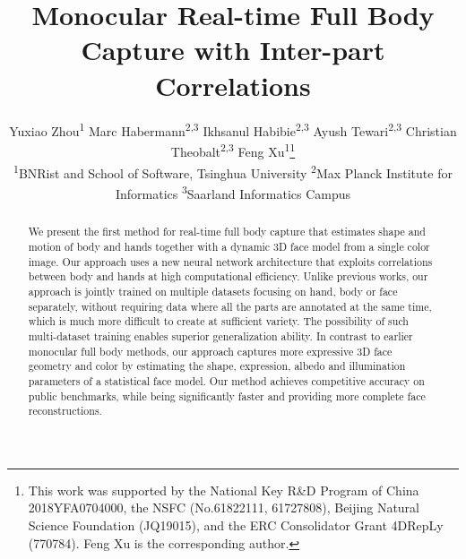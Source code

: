 \documentclass[final]{cvpr}
\begin{document}
\setlength{\abovecaptionskip}{1pt}

\setlength{\belowcaptionskip}{-10pt}

\title{Monocular Real-time Full Body Capture with Inter-part Correlations}

\author{
  \normalsize{Yuxiao Zhou\textsuperscript{1}}
  \quad
  \normalsize{Marc Habermann\textsuperscript{2,3}}
  \quad
  \normalsize{Ikhsanul Habibie\textsuperscript{2,3}}
  \quad
  \normalsize{Ayush Tewari\textsuperscript{2,3}}
  \quad
  \normalsize{Christian Theobalt\textsuperscript{2,3}}
  \quad
  \normalsize{Feng Xu\textsuperscript{1}\thanks{This work was supported by the National Key R\&D Program of China 2018YFA0704000, the NSFC (No.61822111, 61727808), Beijing Natural Science Foundation (JQ19015), and the ERC Consolidator Grant 4DRepLy (770784). Feng Xu is the corresponding author.}}\\
  \small{\textsuperscript{1}BNRist and School of Software, Tsinghua University}
  \quad
  \small{\textsuperscript{2}Max Planck Institute for Informatics}
  \quad
  \small{\textsuperscript{3}Saarland Informatics Campus}
}

\maketitle

\begin{abstract}
	We present the first method for real-time full body capture that estimates shape and motion of body and hands together with a dynamic 3D face model from a single color image.
Our approach uses a new neural network architecture that exploits correlations between body and hands at high computational efficiency.
Unlike previous works, our approach is jointly trained on multiple datasets focusing on hand, body or face separately, without requiring data where all the parts are annotated at the same time, which is much more difficult to create at sufficient variety.
The possibility of such multi-dataset training enables superior generalization ability.
In contrast to earlier monocular full body methods, our approach captures more expressive 3D face geometry and color by estimating the shape, expression, albedo and illumination parameters of a statistical face model.
Our method achieves competitive accuracy on public benchmarks, while being significantly faster and providing more complete face reconstructions.
 \end{abstract}
\end{document}
